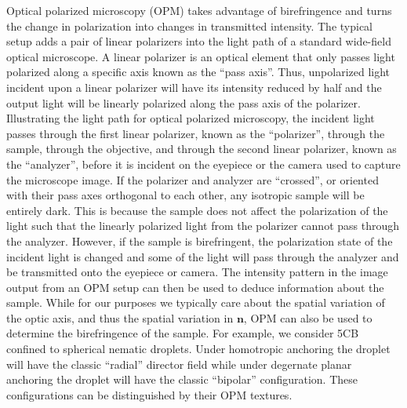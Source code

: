 Optical polarized microscopy (OPM) takes advantage of birefringence and turns the change in polarization into changes in transmitted intensity.
The typical setup adds a pair of linear polarizers into the light path of a standard wide-field optical microscope.
A linear polarizer is an optical element that only passes light polarized along a specific axis known as the ``pass axis''.
Thus, unpolarized light incident upon a linear polarizer will have its intensity reduced by half and the output light will be linearly polarized along the pass axis of the polarizer.
Illustrating the light path for optical polarized microscopy, the incident light passes through the first linear polarizer, known as the ``polarizer'', through the sample, through the objective, and through the second linear polarizer, known as the ``analyzer'', before it is incident on the eyepiece or the camera used to capture the microscope image.
If the polarizer and analyzer are ``crossed'', or oriented with their pass axes orthogonal to each other, any isotropic sample will be entirely dark.
This is because the sample does not affect the polarization of the light such that the linearly polarized light from the polarizer cannot pass through the analyzer.
However, if the sample is birefringent, the polarization state of the incident light is changed and some of the light will pass through the analyzer and be transmitted onto the eyepiece or camera.
The intensity pattern in the image output from an OPM setup can then be used to deduce information about the sample.
While for our purposes we typically care about the spatial variation of the optic axis, and thus the spatial variation in $\mathbf{n}$, OPM can also be used to determine the birefringence of the sample.
For example, we consider 5CB confined to spherical nematic droplets.
Under homotropic anchoring the droplet will have the classic ``radial'' director field while under degernate planar anchoring the droplet will have the classic ``bipolar'' configuration.
These configurations can be distinguished by their OPM textures.

